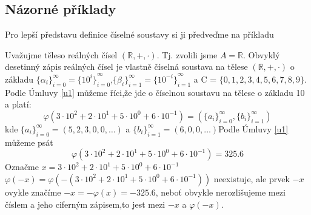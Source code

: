 \documentclass[czech,bachelor,dept470,male]{diploma}
\newcommand{\poslbeta}{\{\beta_i\}_{i=1}^{\infty}}
\newcommand{\poslalpha}{\{\alpha_i\}_{i=0}^{\infty}}
\newcommand{\posla}{\{a_i\}_{i=0}^{\infty}}
\newcommand{\poslb}{\{b_i\}_{i=1}^{\infty}}
\begin{document}
\subsection{Názorné příklady}
Pro lepší představu definice číselné soustavy si ji předveďme na příkladu
\begin{example}
	Uvažujme těleso reálných čísel $(\mathbb{R},+,\cdot)$. Tj. zvolili jsme $A = \mathbb{R}$. Obvyklý desetinný zápis reálných čísel je vlastně číselná soustava na tělese $(\mathbb{R},+,\cdot)$ o základu $\poslalpha=\{{10^i\}}_{i=0}^{\infty}$,\newline $\poslbeta=\{{10^{-i}\}}_{i=1}^{\infty}$ a C = $\{0,1,2,3,4,5,6,7,8,9\}$. Podle Úmluvy \ref{u1} můžeme říci,\newline že jde o číselnou soustavu na tělese o základu 10 a platí:
	$$\varphi(3\cdot10^2+2\cdot10^1+5\cdot10^0+6\cdot10^{-1})=(\posla,\poslb)$$kde
	$\posla=(5,2,3,0,0,\dots)$ a $\poslb = (6,0,0,\dots)$\newline Podle Úmluvy \ref{u1} můžeme psát $$\varphi(3\cdot10^2+2\cdot10^1+5\cdot10^0+6\cdot10^{-1})=325.6$$
	Označme $x=3\cdot10^2+2\cdot10^1+5\cdot10^0+6\cdot10^{-1}$\newline
	$\varphi(-x) = \varphi(-(3\cdot10^2+2\cdot10^1+5\cdot10^0+6\cdot10^{-1}))$ neexistuje, ale prvek $-x$ ovykle značíme $-x=-\varphi(x)=-325.6$, neboť obvykle nerozlišujeme mezi číslem a jeho ciferným zápisem,\newline to jest mezi $-x$ a $\varphi(-x)$.
\end{example}
\end{document}
